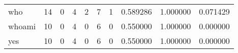 \begin{longtable}{lrrrrrrrrr}
who       &                                       14 &                                                  0 &                                                  4 &                                                  2 &                                                  7 &                                                  1 &                                           0.589286 &                               1.000000 &                             0.071429 \\
whoami    &                                       10 &                                                  0 &                                                  4 &                                                  0 &                                                  6 &                                                  0 &                                           0.550000 &                               1.000000 &                             0.000000 \\
yes       &                                       10 &                                                  0 &                                                  4 &                                                  0 &                                                  6 &                                                  0 &                                           0.550000 &                               1.000000 &                             0.000000 \\
\end{longtable}
